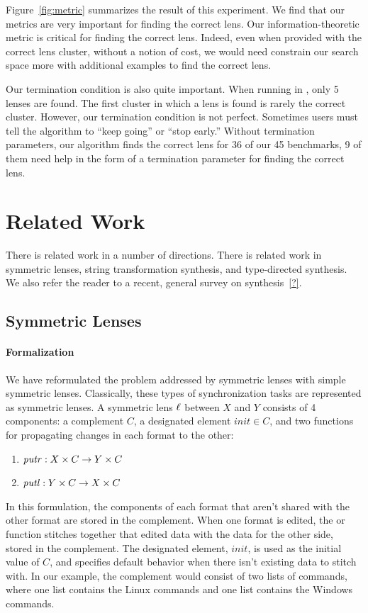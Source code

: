 \documentclass[acmsmall,screen,anonymous]{acmart}
\begin{document}
Figure~\ref{fig:metric} summarizes the result of this experiment. We find that
our metrics are very important for finding the correct lens. Our
information-theoretic metric is critical for finding the correct lens. Indeed,
even when provided with the correct lens cluster, without a notion of cost, we
would need constrain our search space more with additional examples to find the
correct lens.

Our termination condition is also quite important. When running in \FCOpt{},
only 5 lenses are found. The first cluster in which a lens is found is rarely
the correct cluster. However, our termination condition is not perfect.
Sometimes users must tell the algorithm to ``keep going'' or ``stop early.''
Without termination parameters, our algorithm finds the correct lens for 36 of
our 45 benchmarks, 9 of them need help in the form of a termination parameter
for finding the correct lens.

\section{Related Work}
\label{sec:related}
There is related work in a number of directions. There is related work in
symmetric lenses, string transformation synthesis, and type-directed synthesis.
We also refer the reader to a recent, general survey on synthesis~\ref{?}.

\subsection{Symmetric Lenses}
\paragraph*{Formalization} We have reformulated the problem addressed by
symmetric lenses with simple symmetric lenses. Classically, these types of
synchronization tasks are represented as symmetric lenses. A symmetric lens
$\mathit{\ell}$ between $X$ and $Y$ consists of 4 components: a complement $C$, a
designated element $init \in C$, and two functions for propagating changes in
each format to the other:
\begin{enumerate}
\item $\mathit{putr} : X \times C \rightarrow Y \times C$
\item $\mathit{putl} : Y \times C \rightarrow X \times C$
\end{enumerate}
In this formulation, the components of each format that aren't shared with the
other format are stored in the complement. When one format is edited, the \PutR
or \PutL function stitches together that edited data with the data for the other
side, stored in the complement.  The designated element, $init$, is used as the
initial value of $C$, and specifies default behavior when there isn't existing
data to stitch with.  In our example, the complement would consist of two lists
of commands, where one list contains the Linux commands and one list contains
the Windows commands.
\end{document}
